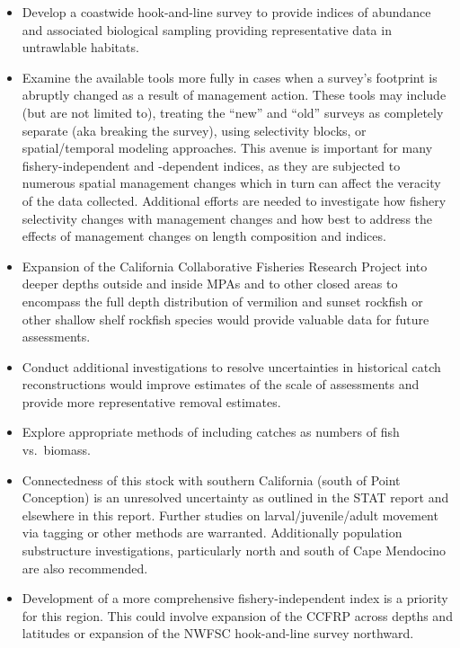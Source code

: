 \documentclass[11pt,
  english,
]{article}
\begin{document}
\begin{itemize}
\item
  Develop a coastwide hook-and-line survey to provide indices of abundance and associated biological sampling providing representative data in untrawlable habitats.
\item
  Examine the available tools more fully in cases when a survey's footprint is abruptly changed as a result of management action. These tools may include (but are not limited to), treating the ``new'' and ``old'' surveys as completely separate (aka breaking the survey), using selectivity blocks, or spatial/temporal modeling approaches. This avenue is important for many fishery-independent and -dependent indices, as they are subjected to numerous spatial management changes which in turn can affect the veracity of the data collected. Additional efforts are needed to investigate how fishery selectivity changes with management changes and how best to address the effects of management changes on length composition and indices.
\item
  Expansion of the California Collaborative Fisheries Research Project into deeper depths outside and inside MPAs and to other closed areas to encompass the full depth distribution of vermilion and sunset rockfish or other shallow shelf rockfish species would provide valuable data for future assessments.
\item
  Conduct additional investigations to resolve uncertainties in historical catch reconstructions would improve estimates of the scale of assessments and provide more representative removal estimates.
\item
  Explore appropriate methods of including catches as numbers of fish vs.~biomass.
\item
  Connectedness of this stock with southern California (south of Point Conception) is an unresolved uncertainty as outlined in the STAT report and elsewhere in this report. Further studies on larval/juvenile/adult movement via tagging or other methods are warranted. Additionally population substructure investigations, particularly north and south of Cape Mendocino are also recommended.
\item
  Development of a more comprehensive fishery-independent index is a priority for this region. This could involve expansion of the CCFRP across depths and latitudes or expansion of the NWFSC hook-and-line survey northward.
\end{itemize}

\tagstructend
\end{document}
